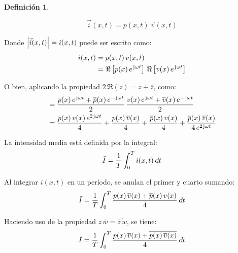 \documentclass[a5paper,12pt,twoside]{book}
\newtheorem{defn}{{Definición}}[chapter]
\begin{document}

\begin{mdframed}[style=DefinitionFrame]
    \begin{defn}
    \end{defn}
    \begin{equation*}
        \Vec{i}(x,t) = p(x,t) \, \Vec{v}(x,t)
    \end{equation*}
\end{mdframed}


Donde ${\left| {\Vec{i}(x,t)} \right|}=i(x,t)$ puede ser escrito como:
\begin{align*}
    i(x,t) &= p(x,t) \, v(x,t)
    \\
    &= \Re \left[ p(x) \, e^{\mkern2mu\mathrm{j}\mkern1mu \omega t} \right] \, \Re \left[ v(x) \, e^{\mkern2mu\mathrm{j}\mkern1mu \omega t} \right]
\end{align*}

O bien, aplicando la propiedad $2\,\Re(z)=z+\overline{z}$, como:
\begin{align*}
    &= \frac{p(x) \, e^{\mkern2mu\mathrm{j}\mkern1mu \omega t} + \overline{p}(x) \, e^{-\mkern2mu\mathrm{j}\mkern1mu \omega t}}{2} \, \frac{v(x) \, e^{\mkern2mu\mathrm{j}\mkern1mu \omega t}+ \overline{v}(x) \, e^{-\mkern2mu\mathrm{j}\mkern1mu \omega t}}{2}
    \\
    &= \frac{p(x)\,v(x)\,e^{2\mkern2mu\mathrm{j}\mkern1mu\omega t}}{4} 
    + \frac{p(x)\,\overline{v}(x)}{4}
    + \frac{\overline{p}(x)\,v(x)}{4}
    + \frac{\overline{p}(x)\,\overline{v}(x)}{4\,e^{2\mkern2mu\mathrm{j}\mkern1mu\omega t}}
\end{align*}

La intensidad media está definida por la integral:
\begin{equation*}
    \bar{I} = \frac{1}{T} \int_0^T i(x,t)\,\textsl{d} t
\end{equation*}

Al integrar $i(x,t)$ en un período, se anulan el primer y cuarto sumando:
\begin{equation*}
    \bar{I} = \frac{1}{T} \int_0^T \frac{p(x)\,\overline{v}(x)+\overline{p}(x)\,v(x)}{4} \,\textsl{d} t
\end{equation*}

Haciendo uso de la propiedad $z\,\overline{w}=\overline{\overline{z}\,w}$, se tiene:
\begin{equation*}
    \bar{I} = \frac{1}{T} \int_0^T \frac{p(x)\,\overline{v}(x)+\overline{p(x)\,\overline{v}(x)}}{4} \,\textsl{d} t
\end{equation*}
\end{document}
